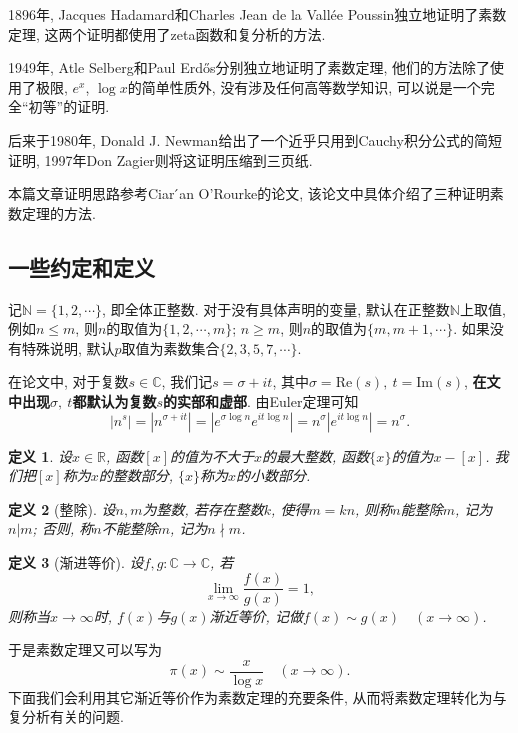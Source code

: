\documentclass[12pt, a4paper, oneside]{ctexart}
\newtheorem{definition}{定义}[section]
\numberwithin{equation}{section}  %
\let\leq=\leqslant %
\let\geq=\geqslant %
\def\R{\mathbb{R}}          %
\def\N{\mathbb{N}}          %
\def\C{\mathbb{C}}          %
\def\re{\mathrm{Re}}        %
\def\im{\mathrm{Im}}        %
\begin{document}
1896年, Jacques Hadamard和Charles Jean de la Vallée Poussin独立地证明了素数定理, 这两个证明都使用了zeta函数和复分析的方法.

1949年, Atle Selberg和Paul Erdős分别独立地证明了素数定理\cite{ref-elementary}, 他们的方法除了使用了极限, $e^x$, $\log x$的简单性质外, 没有涉及任何高等数学知识, 可以说是一个完全“初等”的证明.

后来于1980年, Donald J. Newman给出了一个近乎只用到Cauchy积分公式的简短证明\cite{ref-newman}, 1997年Don Zagier则将这证明压缩到三页纸.

本篇文章证明思路参考Ciar ́an O’Rourke的论文\cite{ref-three}, 该论文中具体介绍了三种证明素数定理的方法.
\subsection{一些约定和定义}
记$\N = \{1, 2, \cdots\}$, 即全体正整数. 对于没有具体声明的变量, 默认在正整数$\N$上取值, 例如$n \leq m$, 则$n$的取值为$\{1, 2,\cdots, m\}$; $n\geq m$, 则$n$的取值为$\{m, m+1,\cdots\}$. 如果没有特殊说明, 默认$p$取值为素数集合$\{2, 3, 5, 7, \cdots\}$.

在论文中, 对于复数$s\in \C$, 我们记$s = \sigma + it$, 其中$\sigma = \re(s),\ t = \im(s)$, \textbf{在文中出现$\sigma,\ t$都默认为复数$s$的实部和虚部}. 由Euler定理可知
\begin{equation*}
    |n^s| = |n^{\sigma +it}| = |e^{\sigma\log n}e^{it\log n}| = n^{\sigma}|e^{it\log n}| = n^{\sigma}.
\end{equation*}
\begin{definition}
    设$x\in\R$, 函数$[x]$的值为不大于$x$的最大整数, 函数$\{x\}$的值为$x - [x]$. 我们把$[x]$称为$x$的整数部分, $\{x\}$称为$x$的小数部分.
\end{definition}
\begin{definition}[整除]
    设$n,m$为整数, 若存在整数$k$, 使得$m = kn$, 则称$n$能整除$m$, 记为$n | m$; 否则, 称$n$不能整除$m$, 记为$n\nmid m$.
\end{definition}
\begin{definition}[渐进等价]
    设$f, g:\C\to\C$, 若
    \begin{equation*}
        \lim_{x\to\infty}\frac{f(x)}{g(x)} = 1,
    \end{equation*}
    则称当$x\to\infty$时, $f(x)$与$g(x)$渐近等价, 记做$f(x)\sim g(x)\quad (x\to\infty)$.
\end{definition}
于是素数定理又可以写为
\begin{equation*}
    \pi(x)\sim\frac{x}{\log x}\quad(x\to \infty).
\end{equation*}
下面我们会利用其它渐近等价作为素数定理的充要条件, 从而将素数定理转化为与复分析有关的问题.
\end{document}
